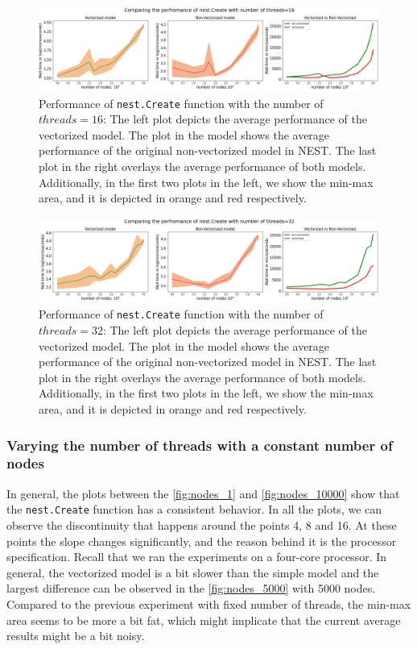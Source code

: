 \begin{figure}[ht!]
    \centering
    \includegraphics[width=\textwidth]{src/pic/thread_16.png}
    \caption{Performance of \texttt{nest.Create} function with the number of $threads=16$: The left plot depicts the average performance of the vectorized model. The plot in the model shows the average performance of the original non-vectorized model in NEST. The last plot in the right overlays the average performance of both models. Additionally, in the first two plots in the left, we show the min-max area, and it is depicted in orange and red respectively.}
    \label{fig:threads_16}
\end{figure}

\begin{figure}[ht!]
    \centering
    \includegraphics[width=\textwidth]{src/pic/thread_32.png}
    \caption{Performance of \texttt{nest.Create} function with the number of $threads=32$: The left plot depicts the average performance of the vectorized model. The plot in the model shows the average performance of the original non-vectorized model in NEST. The last plot in the right overlays the average performance of both models. Additionally, in the first two plots in the left, we show the min-max area, and it is depicted in orange and red respectively.}
    \label{fig:threads_32}
\end{figure}

\subsubsection*{Varying the number of threads with a constant number of nodes}


In general, the plots between the \autoref{fig:nodes_1} and \autoref{fig:nodes_10000} show that the \texttt{nest.Create} function has a consistent behavior. In all the plots, we can observe the discontinuity that happens around the points 4, 8 and 16. At these points the slope changes significantly, and the reason behind it is the processor specification. Recall that we ran the experiments on a four-core processor. In general, the vectorized model is a bit slower than the simple model and the largest difference can be observed in the \autoref{fig:nodes_5000} with 5000 nodes. Compared to the previous experiment with fixed number of threads, the min-max area seems to be more a bit fat, which might implicate that the current average results might be a bit noisy.

